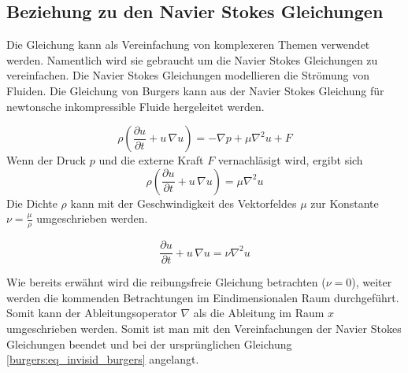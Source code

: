 	
	\subsection{Beziehung zu den Navier Stokes Gleichungen}
		Die Gleichung kann als Vereinfachung von komplexeren Themen verwendet werden.
		Namentlich wird sie gebraucht um die Navier Stokes Gleichungen zu vereinfachen.
		Die Navier Stokes Gleichungen modellieren die Str\"omung von Fluiden.
		Die Gleichung von Burgers kann aus der Navier Stokes Gleichung f\"ur newtonsche inkompressible Fluide hergeleitet werden. \cite{burgers:navier}
		
		
		\begin{equation}
			\rho \left(\frac{\partial u}{\partial t} + u \, \nabla u \right) = -\nabla p + \mu \nabla^2 u + F 	
			\label{burgers:eq_navier}
		\end{equation}
		Wenn der Druck $p$ und die externe Kraft $F$ vernachl\"asigt wird, ergibt sich
		\begin{equation}
			\rho \left(\frac{\partial u}{\partial t} + u \, \nabla u \right) = \mu \nabla^2 u
			 \label{burgers:eq_navier2}
		\end{equation}
		Die Dichte $\rho$ kann mit der Geschwindigkeit des Vektorfeldes $\mu$ zur Konstante $\nu = \frac{\mu}{\rho}$ umgeschrieben werden.
		
		\begin{equation}
			 \frac{\partial u}{\partial t} + u \,\nabla u = \nu \nabla^2 u 
			 \label{burgers:eq_navier3}
		\end{equation}
		
		Wie bereits erw\"ahnt wird die reibungsfreie Gleichung betrachten ($\nu = 0$), weiter werden die kommenden Betrachtungen im Eindimensionalen Raum durchgef\"uhrt.
		Somit kann der Ableitungsoperator $\nabla$ als die Ableitung im Raum $x$ umgeschrieben werden.
		Somit ist man mit den Vereinfachungen der Navier Stokes Gleichungen beendet und bei der urspr\"unglichen Gleichung \eqref{burgers:eq_invisid_burgers} angelangt.
	
		